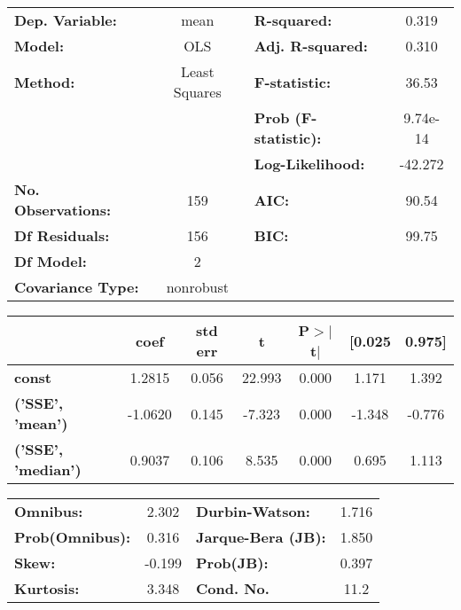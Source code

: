\begin{center}
\begin{tabular}{lclc}
\toprule
\textbf{Dep. Variable:}    &       mean       & \textbf{  R-squared:         } &    0.319  \\
\textbf{Model:}            &       OLS        & \textbf{  Adj. R-squared:    } &    0.310  \\
\textbf{Method:}           &  Least Squares   & \textbf{  F-statistic:       } &    36.53  \\
                           &                  & \textbf{  Prob (F-statistic):} & 9.74e-14  \\
                           &                  & \textbf{  Log-Likelihood:    } &  -42.272  \\
\textbf{No. Observations:} &         159      & \textbf{  AIC:               } &    90.54  \\
\textbf{Df Residuals:}     &         156      & \textbf{  BIC:               } &    99.75  \\
\textbf{Df Model:}         &           2      & \textbf{                     } &           \\
\textbf{Covariance Type:}  &    nonrobust     & \textbf{                     } &           \\
\bottomrule
\end{tabular}
\end{center}\begin{center}
\begin{tabular}{lcccccc}
\toprule
                                & \textbf{coef} & \textbf{std err} & \textbf{t} & \textbf{P$>$$|$t$|$} & \textbf{[0.025} & \textbf{0.975]}  \\
\midrule
\textbf{const}                  &       1.2815  &        0.056     &    22.993  &         0.000        &        1.171    &        1.392     \\
\textbf{('SSE', 'mean')}   &      -1.0620  &        0.145     &    -7.323  &         0.000        &       -1.348    &       -0.776     \\
\textbf{('SSE', 'median')} &       0.9037  &        0.106     &     8.535  &         0.000        &        0.695    &        1.113     \\
\bottomrule
\end{tabular}
\end{center}\begin{center}
\begin{tabular}{lclc}
\toprule
\textbf{Omnibus:}       &  2.302 & \textbf{  Durbin-Watson:     } &    1.716  \\
\textbf{Prob(Omnibus):} &  0.316 & \textbf{  Jarque-Bera (JB):  } &    1.850  \\
\textbf{Skew:}          & -0.199 & \textbf{  Prob(JB):          } &    0.397  \\
\textbf{Kurtosis:}      &  3.348 & \textbf{  Cond. No.          } &     11.2  \\
\bottomrule
\end{tabular}
\end{center}

